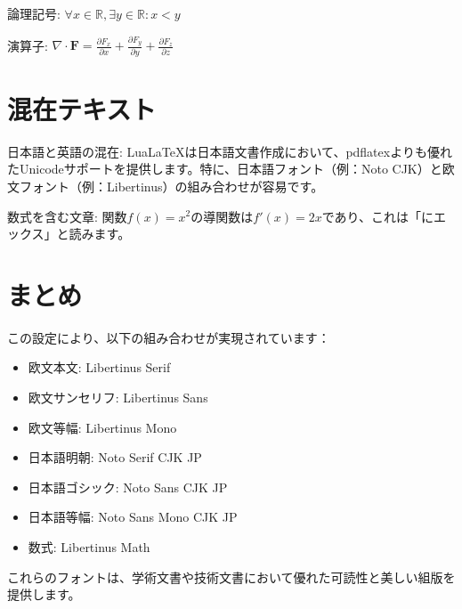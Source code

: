 \documentclass[a4paper,12pt]{ltjsarticle}
\begin{document}
論理記号: $\forall x \in \mathbb{R}, \exists y \in \mathbb{R} : x < y$

演算子: $\nabla \cdot \mathbf{F} = \frac{\partial F_x}{\partial x} + \frac{\partial F_y}{\partial y} + \frac{\partial F_z}{\partial z}$

\section{混在テキスト}

日本語と英語の混在: Lua\LaTeX{}は日本語文書作成において、pdflatexよりも優れたUnicodeサポートを提供します。特に、日本語フォント（例：Noto CJK）と欧文フォント（例：Libertinus）の組み合わせが容易です。

数式を含む文章: 関数$f(x) = x^2$の導関数は$f'(x) = 2x$であり、これは「にエックス」と読みます。

\section{まとめ}

この設定により、以下の組み合わせが実現されています：

\begin{itemize}
    \item 欧文本文: Libertinus Serif
    \item 欧文サンセリフ: Libertinus Sans
    \item 欧文等幅: Libertinus Mono
    \item 日本語明朝: Noto Serif CJK JP
    \item 日本語ゴシック: Noto Sans CJK JP
    \item 日本語等幅: Noto Sans Mono CJK JP
    \item 数式: Libertinus Math
\end{itemize}

これらのフォントは、学術文書や技術文書において優れた可読性と美しい組版を提供します。
\end{document}
